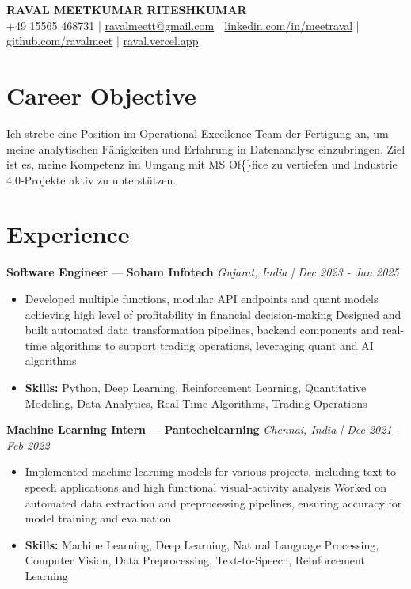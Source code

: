 \documentclass[a4paper,10pt]{article}
\begin{document}
\begin{center}
  {\Large\bfseries RAVAL MEETKUMAR RITESHKUMAR}\\[2pt]
  {\small +49 15565 468731 \;|\; \href{mailto:ravalmeett@gmail.com}{ravalmeett@gmail.com} \;|\; \href{https://www.linkedin.com/in/meetraval/}{linkedin.com/in/meetraval} \;|\; \href{https://github.com/ravalmeet}{github.com/ravalmeet} \;|\; \href{https://raval.vercel.app/}{raval.vercel.app}}
\end{center}
\vspace{-3pt}

\section*{Career Objective}
Ich strebe eine Position im Operational-Excellence-Team der Fertigung an, um meine analytischen Fähigkeiten und Erfahrung in Datenanalyse einzubringen. Ziel ist es, meine Kompetenz im Umgang mit MS Of\{\}fice zu vertiefen und Industrie 4.0-Projekte aktiv zu unterstützen.\par

\section*{Experience}
\textbf{Software Engineer} — \textbf{Soham Infotech} \hfill \textit{Gujarat, India \;|\; Dec 2023 - Jan 2025}\par
\vspace{1pt}
\begin{itemize}
  \item Developed multiple functions, modular API endpoints and quant models achieving high level of profitability in financial decision-making Designed and built automated data transformation pipelines, backend components and real-time algorithms to support trading operations, leveraging quant and AI algorithms
  \item \textbf{Skills:} Python, Deep Learning, Reinforcement Learning, Quantitative Modeling, Data Analytics, Real-Time Algorithms, Trading Operations
\end{itemize}
\vspace{3pt}
\textbf{Machine Learning Intern} — \textbf{Pantechelearning} \hfill \textit{Chennai, India \;|\; Dec 2021 - Feb 2022}\par
\vspace{1pt}
\begin{itemize}
  \item Implemented machine learning models for various projects, including text-to-speech applications and high functional visual-activity analysis Worked on automated data extraction and preprocessing pipelines, ensuring accuracy for model training and evaluation
  \item \textbf{Skills:} Machine Learning, Deep Learning, Natural Language Processing, Computer Vision, Data Preprocessing, Text-to-Speech, Reinforcement Learning
\end{itemize}
\end{document}
